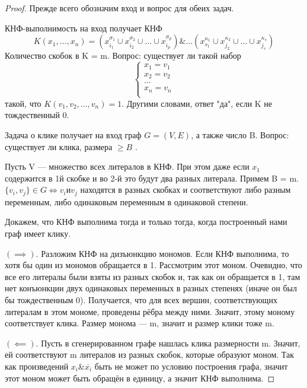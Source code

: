 \begin{proof}
Прежде всего обозначим вход и вопрос для обеих задач. 

КНФ-выполнимость на вход получает КНФ \[
K(x_1,\ldots,x_n) = \left(x_{i_1}^{\sigma_1} \cup x_{i_2}^{\sigma_2}\cup\ldots\cup
x_{i_p}^{\sigma_p}\right) \&\ldots\left( x_{s_1}^{\kappa_1} \cup
x_{j_2}^{\kappa_2}\cup\ldots\cup x_{j_s}^{\kappa_s} \right)
\] 
Количество скобок в K = m. Вопрос: существует ли такой набор \[
\begin{cases}
	x_1 = v_1\\
	x_2=v_2\\
	\ldots\\
	x_n = v_n\\
\end{cases}
\] такой, что $K(v_1, v_2,\ldots,v_n) = 1$. Другими словами, ответ
"да"{}, если K не тождественный 0.

Задача о клике получает на вход граф $G = (V, E)$, а также число B. Вопрос:
существует ли клика, размера $\ge B$ . 

Пусть V --- множество всех литералов в КНФ. При этом даже если $x_1$
содержится в 1й скобке и во 2-й это будут два разных литерала. Примем B = m.
$\{v_i, v_j\} \in G \Leftrightarrow v_i \text{и} v_j$ находятся в разных скобках
и соответствуют либо разным переменным, либо одинаковым переменным в одинаковой
степени.

Докажем, что КНФ выполнима тогда и только тогда, когда построенный нами граф
имеет клику. 

$(\implies)$. Разложим КНФ на дизъюнкцию мономов. Если КНФ выполнима, то хотя бы один из
мономов обращается в 1. Рассмотрим этот моном. Очевидно, что все его литералы
были взяты из разных скобок и, так как он обращается в 1, там нет конъюнкции
двух одинаковых переменных в разных степенях (иначе он был бы тождественным 0).
Получается, что для всех вершин, соответствующих литералам в этом мономе,
проведены рёбра между ними. Значит, этому моному соответствует клика. Размер
монома --- m, значит и размер клики тоже m.

$\left( \impliedby \right) $. Пусть в сгенерированном графе нашлась клика
размерности m. Значит, ей соответствуют m литералов из разных скобок, которые
образуют моном. Так как произведений $x_i \& \overline{x_i}$ быть не может по
условию построения графа, значит этот моном может быть обращён в единицу, а
значит КНФ выполнима.

\end{proof}

